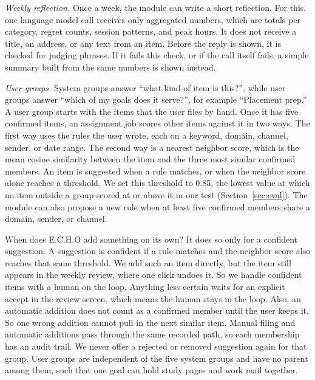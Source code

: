 \documentclass[conference]{IEEEtran}
\begin{document}
\textit{Weekly reflection.} Once a week, the module can write a short reflection. For this, one language model call receives only aggregated numbers, which are totals per category, regret counts, session patterns, and peak hours. It does not receive a title, an address, or any text from an item. Before the reply is shown, it is checked for judging phrases. If it fails this check, or if the call itself fails, a simple summary built from the same numbers is shown instead.

\textit{User groups.} System groups answer ``what kind of item is this?'', while user groups answer ``which of my goals does it serve?'', for example ``Placement prep.'' A user group starts with the items that the user files by hand. Once it has five confirmed items, an assignment job scores other items against it in two ways. The first way uses the rules the user wrote, each on a keyword, domain, channel, sender, or date range. The second way is a nearest neighbor score, which is the mean cosine similarity between the item and the three most similar confirmed members. An item is suggested when a rule matches, or when the neighbor score alone reaches a threshold. We set this threshold to 0.85, the lowest value at which no item outside a group scored at or above it in our test (Section~\ref{sec:eval}). The module can also propose a new rule when at least five confirmed members share a domain, sender, or channel.

When does E.C.H.O add something on its own? It does so only for a confident suggestion. A suggestion is confident if a rule matches and the neighbor score also reaches that same threshold. We add such an item directly, but the item still appears in the weekly review, where one click undoes it. So we handle confident items with a human on the loop. Anything less certain waits for an explicit accept in the review screen, which means the human stays in the loop. Also, an automatic addition does not count as a confirmed member until the user keeps it. So one wrong addition cannot pull in the next similar item. Manual filing and automatic additions pass through the same recorded path, so each membership has an audit trail. We never offer a rejected or removed suggestion again for that group. User groups are independent of the five system groups and have no parent among them, such that one goal can hold study pages and work mail together.

\end{document}
